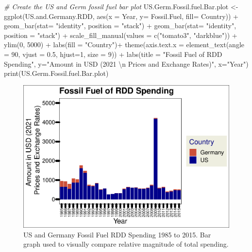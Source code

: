 \documentclass[
  12pt,
]{article}
\newenvironment{Shaded}{\begin{snugshade}}{\end{snugshade}}
\newcommand{\AttributeTok}[1]{\textcolor[rgb]{0.77,0.63,0.00}{#1}}
\newcommand{\CommentTok}[1]{\textcolor[rgb]{0.56,0.35,0.01}{\textit{#1}}}
\newcommand{\DecValTok}[1]{\textcolor[rgb]{0.00,0.00,0.81}{#1}}
\newcommand{\FloatTok}[1]{\textcolor[rgb]{0.00,0.00,0.81}{#1}}
\newcommand{\FunctionTok}[1]{\textcolor[rgb]{0.00,0.00,0.00}{#1}}
\newcommand{\NormalTok}[1]{#1}
\newcommand{\OtherTok}[1]{\textcolor[rgb]{0.56,0.35,0.01}{#1}}
\newcommand{\SpecialCharTok}[1]{\textcolor[rgb]{0.00,0.00,0.00}{#1}}
\newcommand{\StringTok}[1]{\textcolor[rgb]{0.31,0.60,0.02}{#1}}
\begin{document}
\begin{Shaded}
\begin{Highlighting}[]
\CommentTok{\# Create the US and Germ fossil fuel bar plot}
\NormalTok{US.Germ.Fossil.fuel.Bar.plot }\OtherTok{\textless{}{-}} \FunctionTok{ggplot}\NormalTok{(US.and.Germany.RDD, }\FunctionTok{aes}\NormalTok{(}\AttributeTok{x =}\NormalTok{ Year, }\AttributeTok{y=}\NormalTok{ Fossil.Fuel, }\AttributeTok{fill=}\NormalTok{ Country)) }\SpecialCharTok{+}
  \FunctionTok{geom\_bar}\NormalTok{(}\AttributeTok{stat=} \StringTok{"identity"}\NormalTok{, }\AttributeTok{position =} \StringTok{"stack"}\NormalTok{) }\SpecialCharTok{+}
  \FunctionTok{geom\_bar}\NormalTok{(}\AttributeTok{stat=} \StringTok{"identity"}\NormalTok{, }\AttributeTok{position =} \StringTok{"stack"}\NormalTok{) }\SpecialCharTok{+}
  \FunctionTok{scale\_fill\_manual}\NormalTok{(}\AttributeTok{values =} \FunctionTok{c}\NormalTok{(}\StringTok{"tomato3"}\NormalTok{, }\StringTok{"darkblue"}\NormalTok{)) }\SpecialCharTok{+}
  \FunctionTok{ylim}\NormalTok{(}\DecValTok{0}\NormalTok{, }\DecValTok{5000}\NormalTok{) }\SpecialCharTok{+}
  \FunctionTok{labs}\NormalTok{(}\AttributeTok{fill =} \StringTok{"Country"}\NormalTok{)}\SpecialCharTok{+}
  \FunctionTok{theme}\NormalTok{(}\AttributeTok{axis.text.x =} \FunctionTok{element\_text}\NormalTok{(}\AttributeTok{angle =} \DecValTok{90}\NormalTok{, }\AttributeTok{vjust =} \FloatTok{0.5}\NormalTok{, }\AttributeTok{hjust=}\DecValTok{1}\NormalTok{, }\AttributeTok{size =} \DecValTok{9}\NormalTok{)) }\SpecialCharTok{+}
  \FunctionTok{labs}\NormalTok{(}\AttributeTok{title =} \StringTok{"Fossil Fuel of RDD Spending"}\NormalTok{,}
       \AttributeTok{y=}\StringTok{"Amount in USD (2021 }\SpecialCharTok{\textbackslash{}n}\StringTok{ Prices and Exchange Rates)"}\NormalTok{,}
       \AttributeTok{x=}\StringTok{"Year"}\NormalTok{)}
\FunctionTok{print}\NormalTok{(US.Germ.Fossil.fuel.Bar.plot)}
\end{Highlighting}
\end{Shaded}

\begin{figure}
\centering
\includegraphics{Chang_Jenkins_Mullens_ENV872_Final_files/figure-latex/US and Germ fossil fuel Bar-1.pdf}
\caption{US and Germany Fossil Fuel RDD Spending 1985 to 2015. Bar graph
used to visually compare relative magnitude of total spending.}
\end{figure}
\end{document}
